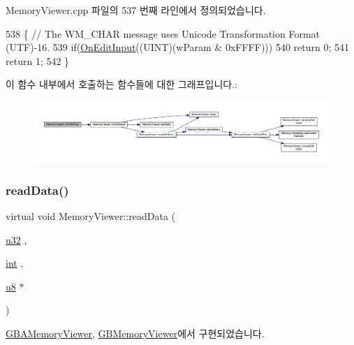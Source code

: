 Memory\+Viewer.\+cpp 파일의 537 번째 라인에서 정의되었습니다.


\begin{DoxyCode}
538 \{ \textcolor{comment}{// The WM\_CHAR message uses Unicode Transformation Format (UTF)-16.}
539   \textcolor{keywordflow}{if}(\mbox{\hyperlink{class_memory_viewer_ab3cf8e1e2318a15b1e7c783b9a7bad80}{OnEditInput}}((UINT)(wParam & 0xFFFF)))
540     \textcolor{keywordflow}{return} 0;
541   \textcolor{keywordflow}{return} 1;
542 \}
\end{DoxyCode}
이 함수 내부에서 호출하는 함수들에 대한 그래프입니다.\+:
\nopagebreak
\begin{figure}[H]
\begin{center}
\leavevmode
\includegraphics[width=350pt]{class_memory_viewer_a47fb6730b742faedeafbb622e008317e_cgraph}
\end{center}
\end{figure}
\mbox{\label{class_memory_viewer_a2e1b969cce8f4d60912f6b640febc54a}} 
\subsubsection{\texorpdfstring{read\+Data()}{readData()}}
{\footnotesize\ttfamily virtual void Memory\+Viewer\+::read\+Data (\begin{DoxyParamCaption}\item[{\mbox{\hyperlink{_system_8h_a10e94b422ef0c20dcdec20d31a1f5049}{u32}}}]{,  }\item[{\mbox{\hyperlink{_util_8cpp_a0ef32aa8672df19503a49fab2d0c8071}{int}}}]{,  }\item[{\mbox{\hyperlink{_system_8h_aed742c436da53c1080638ce6ef7d13de}{u8}} $\ast$}]{ }\end{DoxyParamCaption})\hspace{0.3cm}{\ttfamily [pure virtual]}}



\mbox{\hyperlink{class_g_b_a_memory_viewer_a443f550e4a3a065a0ae3a1142c678e91}{G\+B\+A\+Memory\+Viewer}}, \mbox{\hyperlink{class_g_b_memory_viewer_a9feb85c84ffef853cad4139ea8c3c567}{G\+B\+Memory\+Viewer}}에서 구현되었습니다.

